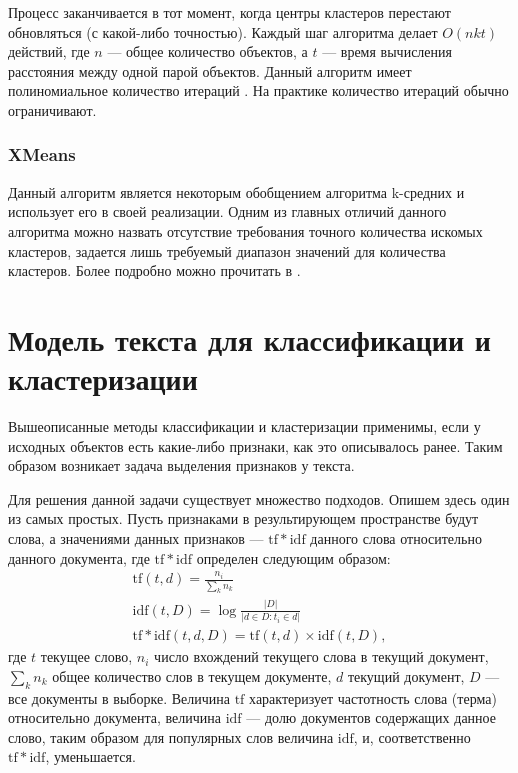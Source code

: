 Процесс заканчивается в тот момент, когда центры кластеров перестают обновляться (с какой-либо точностью). Каждый шаг алгоритма делает $O(nkt)$ действий, где $n$ --- общее количество объектов, а $t$ --- время вычисления расстояния между одной парой объектов. Данный алгоритм имеет полиномиальное количество итераций \cite{DBLP:journals/corr/abs-0904-1113}. На практике количество итераций обычно ограничивают.

\subsubsection{XMeans}
Данный алгоритм является некоторым обобщением алгоритма k-средних и использует его в своей реализации. Одним из главных отличий данного алгоритма можно назвать отсутствие требования точного количества искомых кластеров, задается лишь требуемый диапазон значений для количества кластеров. Более подробно можно прочитать в \cite{Pelleg2000}.

\section{Модель текста для классификации и кластеризации}
\label{sec:text-model}
Вышеописанные методы классификации и кластеризации применимы, если у исходных объектов есть какие-либо признаки, как это описывалось ранее. Таким образом возникает задача выделения признаков у текста.

Для решения данной задачи существует множество подходов. Опишем здесь один из самых простых. Пусть признаками в результирующем пространстве будут слова, а значениями данных признаков --- $\mathrm{tf*idf}$ данного слова относительно данного документа, где $\mathrm{tf*idf}$ определен следующим образом: \begin{gather}
\mathrm{tf}(t, d) = \frac{n_i}{\sum_k n_k} \\
\mathrm{idf}(t, D) =  \log \frac{|D|}{|d \in D : t_i \in d|} \\
\mathrm{tf*idf}(t,d,D) = \mathrm{tf}(t,d) \times \mathrm{idf}(t, D),
\end{gather} где $t$ текущее слово, $n_i$ число вхождений текущего слова в текущий документ, $\sum_k n_k$ общее количество слов в текущем документе, $d$ текущий документ, $D$ --- все документы в выборке. Величина $\mathrm{tf}$ характеризует частотность слова (терма) относительно документа, величина $\mathrm{idf}$ --- долю документов содержащих данное слово, таким образом для популярных слов величина $\mathrm{idf}$, и, соответственно $\mathrm{tf*idf}$, уменьшается.

